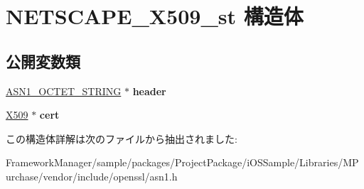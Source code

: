 \hypertarget{struct_n_e_t_s_c_a_p_e___x509__st}{}\section{N\+E\+T\+S\+C\+A\+P\+E\+\_\+\+X509\+\_\+st 構造体}
\label{struct_n_e_t_s_c_a_p_e___x509__st}
\subsection*{公開変数類}
\begin{DoxyCompactItemize}
\item 
\hypertarget{struct_n_e_t_s_c_a_p_e___x509__st_a00f5f31a882f9ee420d1a3bd2beebedd}{}\hyperlink{structasn1__string__st}{A\+S\+N1\+\_\+\+O\+C\+T\+E\+T\+\_\+\+S\+T\+R\+I\+N\+G} $\ast$ {\bfseries header}\label{struct_n_e_t_s_c_a_p_e___x509__st_a00f5f31a882f9ee420d1a3bd2beebedd}

\item 
\hypertarget{struct_n_e_t_s_c_a_p_e___x509__st_ae73d9f6791b788f7c724b89f715d3d76}{}\hyperlink{structx509__st}{X509} $\ast$ {\bfseries cert}\label{struct_n_e_t_s_c_a_p_e___x509__st_ae73d9f6791b788f7c724b89f715d3d76}

\end{DoxyCompactItemize}


この構造体詳解は次のファイルから抽出されました\+:\begin{DoxyCompactItemize}
\item 
Framework\+Manager/sample/packages/\+Project\+Package/i\+O\+S\+Sample/\+Libraries/\+M\+Purchase/vendor/include/openssl/asn1.\+h\end{DoxyCompactItemize}
